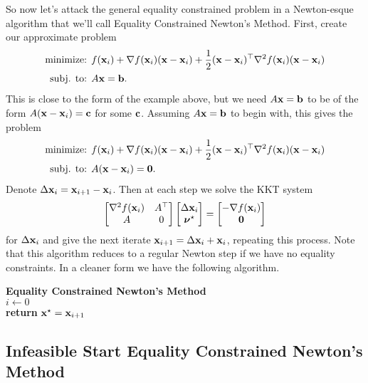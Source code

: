 \documentclass[12pt,letterpaper]{article}
\begin{document}
So now let's attack the general equality constrained problem in a Newton-esque algorithm
that we'll call Equality Constrained Newton's Method. First, create our approximate problem
\begin{align*}
    \text{minimize: } & f({\bf x}_i) + \nabla f({\bf x}_i) ({\bf x} - {\bf x}_i) + \frac{1}{2}({\bf x} - {\bf x}_i)^\top\nabla^2 f({\bf x}_i) ({\bf x} - {\bf x}_i)\\
    \text{subj. to: } & A{\bf x} = {\bf b}.
\end{align*}
This is close to the form of the example above, but we need $A{\bf x} = {\bf b}$ to be of
the form $A({\bf x} - {\bf x}_i) = {\bf c}$ for some ${\bf c}$. Assuming $A{\bf x} = {\bf b}$ to begin with,
this gives the problem
\begin{align*}
    \text{minimize: } & f({\bf x}_i) + \nabla f({\bf x}_i) ({\bf x} - {\bf x}_i) + \frac{1}{2}({\bf x} - {\bf x}_i)^\top\nabla^2 f({\bf x}_i) ({\bf x} - {\bf x}_i)\\
    \text{subj. to: } & A({\bf x}-{\bf x}_i) = {\bf 0}.
\end{align*}
Denote $\Delta {\bf x}_i = {\bf x}_{i+1} - {\bf x}_i$. Then at each step we solve the KKT system
\[
    \begin{bmatrix} \nabla^2 f({\bf x}_i) & A^\top\\A & 0 \end{bmatrix} \begin{bmatrix} \Delta {\bf x}_i\\\hbox{\boldmath$\nu$}^\star \end{bmatrix} = \begin{bmatrix} -\nabla f({\bf x}_i)\\{\bf 0} \end{bmatrix}
\]
for $\Delta{\bf x}_i$ and give the next iterate ${\bf x}_{i+1} = \Delta{\bf x}_i + {\bf x}_i$, repeating this process.
Note that this algorithm reduces to a regular Newton step if we have no equality constraints. In a cleaner
form we have the following algorithm.

\IncMargin{1em}
\begin{algorithm}
    \textbf{Equality Constrained Newton's Method}\\
    $i \leftarrow 0$\\
    \textbf{return } ${\bf x}^\star = {\bf x}_{i+1}$
\end{algorithm}

\subsection{Infeasible Start Equality Constrained Newton's Method}
\end{document}
